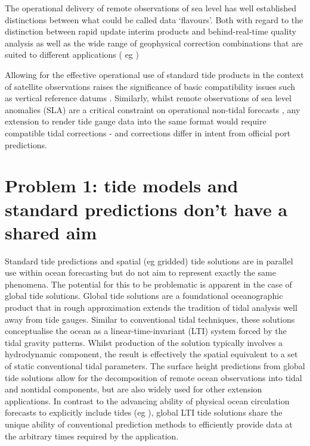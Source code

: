 The operational delivery of remote  observations of sea level has well established distinctions between what could be called data `flavours'.   Both with regard to the distinction between rapid update interim products and behind-real-time quality analysis as well as the wide range of geophysical  correction combinations that are suited to different applications ( eg \citep{Scharroo:2014vv} )


Allowing for the effective operational use of standard tide products in the context of satellite observations raises the significance of basic compatibility 
issues such as vertical reference datums \citep{10.3389/fmars.2020.549467}.
Similarly, whilst remote observations of sea level anomalies (SLA) are a critical constraint on operational non-tidal forecasts \citep{10.1080/1755876x.2019.1685834}, any extension to render tide gauge data into the same format would require compatible tidal corrections - and corrections differ in intent from official port predictions.


\section{Problem 1: tide models and standard predictions don't have a shared aim}
\label{Sec:OfficialGlobal}
Standard tide predictions and spatial (eg gridded) tide solutions are in parallel use within ocean forecasting but do not aim to represent exactly the same phenomena.    The potential for this to be problematic is apparent in the case of global tide solutions. 
Global tide solutions are a foundational oceanographic product that in rough approximation extends the tradition of tidal analysis well away from tide gauges.   Similar to conventional tidal techniques, these solutions conceptualise the ocean as a linear-time-invariant (LTI) system forced by the tidal gravity patterns. Whilst production of the solution typically involves a hydrodynamic component\cite{Egbert:2002ug}, the result is effectively the spatial equivalent to a set of static conventional tidal parameters.   The surface height predictions from global tide solutions allow for the decomposition of remote ocean observations into tidal and nontidal components, but are also widely used for other extension applications.
In contrast to the advancing ability of physical ocean circulation forecasts to explicitly include tides (eg \cite{10.1016/j.ocemod.2019.02.008}), global LTI tide solutions share the unique ability of conventional prediction methods to efficiently provide data at the arbitrary times required by the application.


